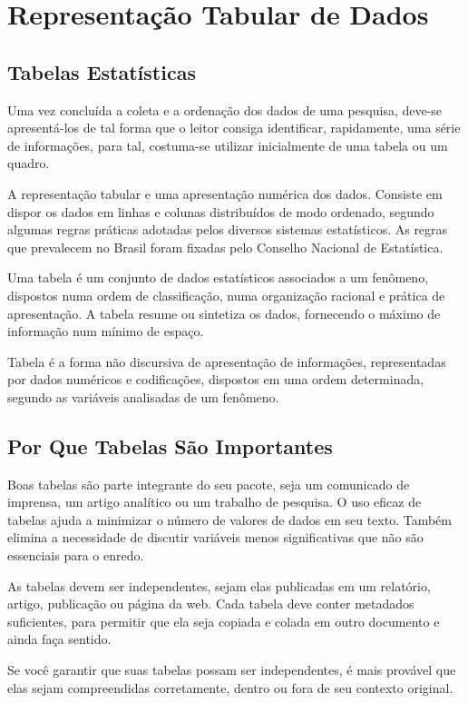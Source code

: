 \chapter{Representação Tabular de Dados}
\section{Tabelas Estatísticas}

\inic Uma vez concluída a coleta e a ordenação dos dados de uma pesquisa, deve-se apresentá-los de tal forma que o leitor consiga identificar, rapidamente, uma série de informações, para tal, costuma-se utilizar inicialmente de uma tabela ou um quadro.\vskip0.3cm

\inic A representação tabular e uma apresentação numérica dos dados. Consiste em dispor os dados em linhas e colunas distribuídos de modo ordenado, segundo algumas regras práticas adotadas pelos diversos sistemas estatísticos. As regras que prevalecem no Brasil foram fixadas pelo Conselho Nacional de Estatística.\vskip0.3cm

\inic Uma tabela é um conjunto de dados estatísticos associados a um fenômeno, dispostos numa ordem de classificação, numa organização racional e prática de apresentação. A tabela resume ou sintetiza os dados, fornecendo o máximo de informação num mínimo de espaço.\vskip0.3cm

\inic Tabela é a forma não discursiva de apresentação de informações, representadas por dados numéricos e codificações, dispostos em uma ordem determinada, segundo as variáveis analisadas de um fenômeno.

\section{Por Que Tabelas São Importantes}

\inic Boas tabelas são parte integrante do seu pacote, seja um comunicado de imprensa, um artigo analítico ou um trabalho de pesquisa. O uso eficaz de tabelas ajuda a minimizar o número de valores de dados em seu texto. Também elimina a necessidade de discutir variáveis ​​menos significativas que não são essenciais para o enredo.\vskip0.3cm

As tabelas devem ser independentes, sejam elas publicadas em um relatório, artigo, publicação ou página da web. Cada tabela deve conter metadados suficientes, para permitir que ela seja copiada e colada em outro documento e ainda faça sentido.\vskip0.3cm

Se você garantir que suas tabelas possam ser independentes, é mais provável que elas sejam compreendidas corretamente, dentro ou fora de seu contexto original.

